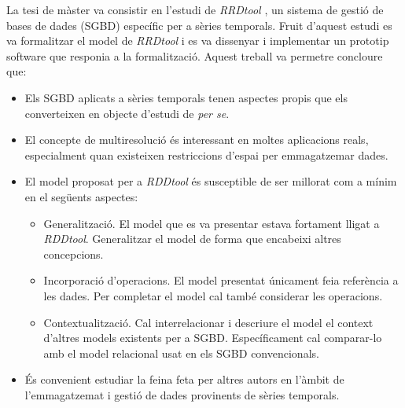 La tesi de màster \parencite{llusa11:tfm} va consistir en l'estudi de
\emph{RRDtool} \parencite{rrdtool}, un sistema de gestió de bases de
dades (SGBD) específic per a sèries temporals.
%
Fruit d'aquest estudi es va formalitzar el model de \emph{RRDtool} i es va
dissenyar i implementar un prototip software que responia a la
formalització.
%
Aquest treball va permetre concloure que:
\begin{itemize}
\item Els SGBD aplicats a sèries temporals tenen aspectes propis que
  els converteixen en objecte d'estudi de \emph{per se}.
\item El concepte de multiresolució és interessant en moltes
  aplicacions reals, especialment quan existeixen restriccions d'espai
  per emmagatzemar dades.
\item El model proposat per a \emph{RDDtool} és susceptible de ser millorat
  com a mínim en el següents aspectes:
  \begin{itemize}
  \item Generalització. El model que es va presentar estava fortament
    lligat a \emph{RDDtool}. Generalitzar el model de forma que encabeixi
    altres concepcions.
  \item Incorporació d'operacions. El model presentat únicament feia
    referència a les dades. Per completar el
    model cal també considerar les operacions.
  \item Contextualització. Cal interrelacionar i descriure el model el
    context d'altres models existents per a SGBD. Específicament cal
    comparar-lo amb el model relacional usat en els SGBD
    convencionals.
  \end{itemize}
\item És convenient estudiar la feina feta per altres autors en
  l'àmbit de l'emmagatzemat i gestió de dades provinents de sèries
  temporals.
\end{itemize}


